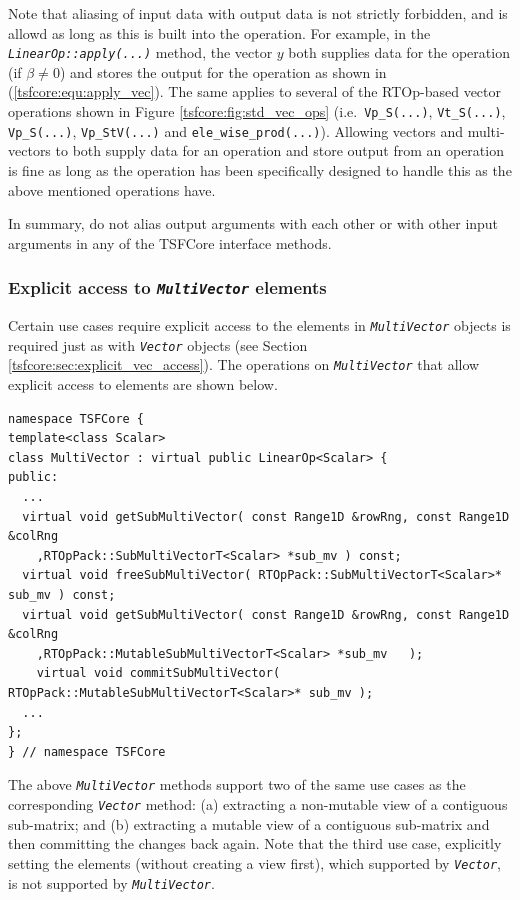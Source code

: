 Note that aliasing of input data with output data is not strictly
forbidden, and is allowd as long as this is built into the operation.
For example, in the {}\texttt{\textit{LinearOp\-::apply(\-...)}}
method, the vector $y$ both supplies data for the operation (if $\beta
\ne 0$) and stores the output for the operation as shown in
(\ref{tsfcore:equ:apply_vec}).  The same applies to several of the
RTOp-based vector operations shown in Figure
{}\ref{tsfcore:fig:std_vec_ops} (i.e.~\texttt{Vp\_S(...)},
{}\texttt{Vt\_S(...)}, {}\texttt{Vp\_S(...)}, {}\texttt{Vp\_StV(...)}
and {}\texttt{ele\_wise\_prod(...)}).  Allowing vectors and
multi-vectors to both supply data for an operation and store output
from an operation is fine as long as the operation has been
specifically designed to handle this as the above mentioned operations
have.

In summary, do not alias output arguments with each other or with
other input arguments in any of the TSFCore interface methods.

%
\subsubsection{Explicit access to {}\texttt{\textit{Multi\-Vector}} elements}
\label{tsfcore:sec:explicit_multi_vec_access}
%

Certain use cases require explicit access to the elements in
{}\texttt{\textit{Multi\-Vector}} objects is required just as with
{}\texttt{\textit{Vector}} objects (see Section
{}\ref{tsfcore:sec:explicit_vec_access}).  The operations on
{}\texttt{\textit{Multi\-Vector}} that allow explicit access to
elements are shown below.

{\scriptsize\begin{verbatim}
namespace TSFCore {
template<class Scalar>
class MultiVector : virtual public LinearOp<Scalar> {
public:
  ...
  virtual void getSubMultiVector( const Range1D &rowRng, const Range1D &colRng
    ,RTOpPack::SubMultiVectorT<Scalar> *sub_mv ) const;
  virtual void freeSubMultiVector( RTOpPack::SubMultiVectorT<Scalar>* sub_mv ) const;
  virtual void getSubMultiVector( const Range1D &rowRng, const Range1D &colRng
    ,RTOpPack::MutableSubMultiVectorT<Scalar> *sub_mv	);
	virtual void commitSubMultiVector( RTOpPack::MutableSubMultiVectorT<Scalar>* sub_mv );
  ...
};
} // namespace TSFCore
\end{verbatim}}

The above {}\texttt{\textit{Multi\-Vector}} methods support two of the
same use cases as the corresponding {}\texttt{\textit{Vector}}
method: (a) extracting a non-mutable view of a contiguous sub-matrix;
and (b) extracting a mutable view of a contiguous sub-matrix and then
committing the changes back again.  Note that the third use case,
explicitly setting the elements (without creating a view first), which
supported by {}\texttt{\textit{Vector}}, is not supported by
{}\texttt{\textit{Multi\-Vector}}.

